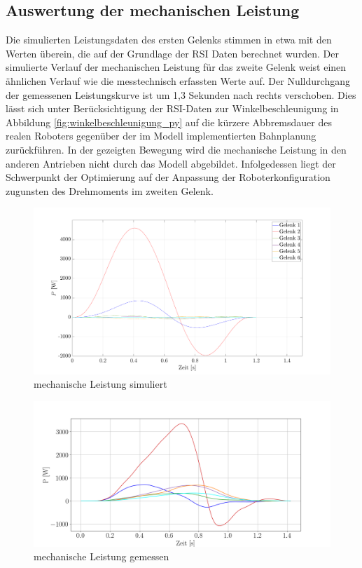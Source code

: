 \subsection*{Auswertung der mechanischen Leistung}
Die simulierten Leistungsdaten des ersten Gelenks stimmen in etwa mit den Werten überein, die auf der Grundlage der RSI Daten berechnet wurden. Der simulierte Verlauf der mechanischen Leistung für das zweite Gelenk weist einen ähnlichen Verlauf wie die messtechnisch erfassten Werte auf. Der Nulldurchgang der gemessenen Leistungskurve ist um 1,3 Sekunden nach rechts verschoben.  Dies lässt sich unter Berücksichtigung der RSI-Daten zur Winkelbeschleunigung in Abbildung \ref{fig:winkelbeschleunigung_py} auf die kürzere Abbremsdauer des realen Roboters gegenüber der im Modell implementierten Bahnplanung  zurückführen. In der gezeigten Bewegung wird die mechanische Leistung in den anderen Antrieben nicht durch das Modell abgebildet. Infolgedessen liegt der Schwerpunkt der Optimierung auf der Anpassung der Roboterkonfiguration zugunsten des Drehmoments im zweiten Gelenk. 
%
\begin{figure}[tbph]
	\centering
	\includegraphics[width=1\linewidth]{images/pmat}
	\caption{mechanische Leistung simuliert}
	\label{fig:pmat}
\end{figure}
%
\begin{figure}[tbph]
	\centering
	\includegraphics[width=1\linewidth]{images/p}
	\caption{mechanische Leistung gemessen}
	\label{fig:p}
\end{figure}
%
